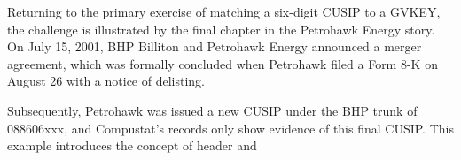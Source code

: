 \documentclass[12pt]{article}
\begin{document}
\begin{center}

\end{center}

Returning to the primary exercise of matching a six-digit CUSIP to a GVKEY, the challenge is illustrated by the final chapter in the Petrohawk Energy story.
On July 15, 2001, BHP Billiton and Petrohawk Energy announced a merger agreement, which was formally concluded when Petrohawk filed a Form 8-K on August 26 with a notice of delisting.

Subsequently, Petrohawk was issued a new CUSIP under the BHP trunk of 088606xxx, and Compustat's records only show evidence of this final CUSIP.
This example introduces the concept of header and 

\begin{center}

\end{center}
\end{document}
